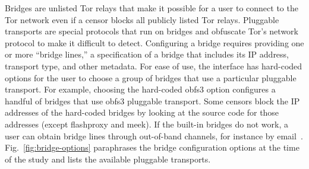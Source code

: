 \documentclass[USenglish,oneside,twocolumn]{article}
\begin{document}
Bridges are unlisted Tor relays that make it possible for a user to connect
to the Tor network even if a censor blocks all publicly listed Tor relays.
Pluggable transports are special protocols that run on bridges and obfuscate
Tor's network protocol to make it difficult to detect. 
Configuring a bridge requires providing one or more
``bridge lines,'' a specification of a bridge that
includes its IP address, transport type, and other metadata.
For ease of use, the interface has hard-coded options for 
the user to choose a group of bridges that use a particular
pluggable transport. For example, choosing  the hard-coded obfs3 option
configures a handful of bridges that use obfs3 pluggable transport.
Some censors block the IP addresses of the hard-coded bridges by looking
at the source code for those addresses (except flashproxy and meek).
If the built-in bridges do not work, a user can obtain bridge lines
through out-of-band channels, for instance by email~\cite{bridgedb}.
Fig.~\ref{fig:bridge-options} paraphrases the bridge configuration
options at the time of the study and lists the available pluggable transports.
\end{document}
